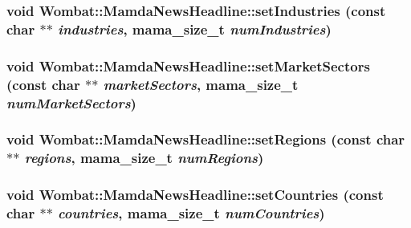 \hypertarget{classWombat_1_1MamdaNewsHeadline_9c29cbb416405c1bbaa4a67b23dcafbc}{
\subsubsection[setIndustries]{\setlength{\rightskip}{0pt plus 5cm}void Wombat::Mamda\-News\-Headline::set\-Industries (const char $\ast$$\ast$ {\em industries}, mama\_\-size\_\-t {\em num\-Industries})}}
\label{classWombat_1_1MamdaNewsHeadline_9c29cbb416405c1bbaa4a67b23dcafbc}


\hypertarget{classWombat_1_1MamdaNewsHeadline_09c39b8b93bd512fb023b6bb856b009b}{
\subsubsection[setMarketSectors]{\setlength{\rightskip}{0pt plus 5cm}void Wombat::Mamda\-News\-Headline::set\-Market\-Sectors (const char $\ast$$\ast$ {\em market\-Sectors}, mama\_\-size\_\-t {\em num\-Market\-Sectors})}}
\label{classWombat_1_1MamdaNewsHeadline_09c39b8b93bd512fb023b6bb856b009b}


\hypertarget{classWombat_1_1MamdaNewsHeadline_dd9a9b5374502b9038586b5d3333bb69}{
\subsubsection[setRegions]{\setlength{\rightskip}{0pt plus 5cm}void Wombat::Mamda\-News\-Headline::set\-Regions (const char $\ast$$\ast$ {\em regions}, mama\_\-size\_\-t {\em num\-Regions})}}
\label{classWombat_1_1MamdaNewsHeadline_dd9a9b5374502b9038586b5d3333bb69}


\hypertarget{classWombat_1_1MamdaNewsHeadline_1fb1437a61f8262914be4a678a282eb8}{
\subsubsection[setCountries]{\setlength{\rightskip}{0pt plus 5cm}void Wombat::Mamda\-News\-Headline::set\-Countries (const char $\ast$$\ast$ {\em countries}, mama\_\-size\_\-t {\em num\-Countries})}}
\label{classWombat_1_1MamdaNewsHeadline_1fb1437a61f8262914be4a678a282eb8}


